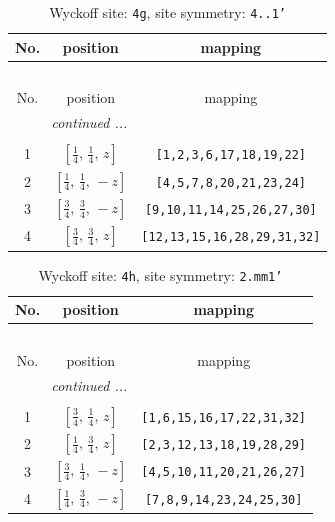 \documentclass[fleqn,8pt]{jsarticle}
\begin{document}
\renewcommand{\arraystretch}{1.2}
\begin{longtable}{ccc}
\caption{Wyckoff site: {\tt 4g}, site symmetry: {\tt 4..1'}}
 \\
 \hline \hline
No. & position & mapping \\ \hline \endfirsthead

\multicolumn{2}{l}{\tablename\ \thetable{}} \\
 \hline \hline
No. & position & mapping \\ \hline \endhead

 \hline \hline
\multicolumn{2}{r}{\footnotesize\it continued ...} \\ \endfoot

 \hline \hline
\multicolumn{2}{r}{} \\ \endlastfoot

1 & $\left[ \frac{1}{4},\, \frac{1}{4},\, z \right]$ & {\tt [1,2,3,6,17,18,19,22]} \\ \hline
2 & $\left[ \frac{1}{4},\, \frac{1}{4},\, - z \right]$ & {\tt [4,5,7,8,20,21,23,24]} \\ \hline
3 & $\left[ \frac{3}{4},\, \frac{3}{4},\, - z \right]$ & {\tt [9,10,11,14,25,26,27,30]} \\ \hline
4 & $\left[ \frac{3}{4},\, \frac{3}{4},\, z \right]$ & {\tt [12,13,15,16,28,29,31,32]} \\
\end{longtable}
\renewcommand{\arraystretch}{1.2}
\begin{longtable}{ccc}
\caption{Wyckoff site: {\tt 4h}, site symmetry: {\tt 2.mm1'}}
 \\
 \hline \hline
No. & position & mapping \\ \hline \endfirsthead

\multicolumn{2}{l}{\tablename\ \thetable{}} \\
 \hline \hline
No. & position & mapping \\ \hline \endhead

 \hline \hline
\multicolumn{2}{r}{\footnotesize\it continued ...} \\ \endfoot

 \hline \hline
\multicolumn{2}{r}{} \\ \endlastfoot

1 & $\left[ \frac{3}{4},\, \frac{1}{4},\, z \right]$ & {\tt [1,6,15,16,17,22,31,32]} \\ \hline
2 & $\left[ \frac{1}{4},\, \frac{3}{4},\, z \right]$ & {\tt [2,3,12,13,18,19,28,29]} \\ \hline
3 & $\left[ \frac{3}{4},\, \frac{1}{4},\, - z \right]$ & {\tt [4,5,10,11,20,21,26,27]} \\ \hline
4 & $\left[ \frac{1}{4},\, \frac{3}{4},\, - z \right]$ & {\tt [7,8,9,14,23,24,25,30]} \\
\end{longtable}
\end{document}

